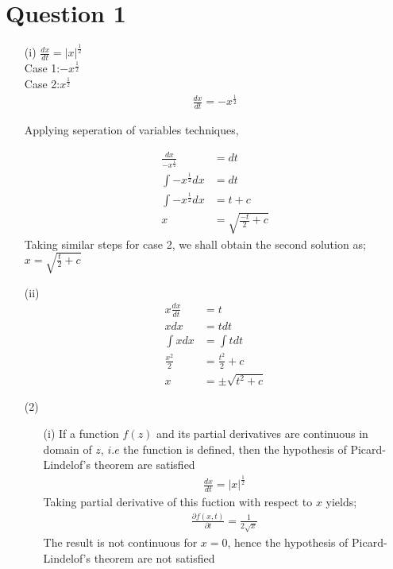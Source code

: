 \documentclass[12pt,a4paper]{article}
\begin{document}
\section*{Question 1}
\begin{itemize}
\item[(i)]
$\frac{dx}{dt}=|x|^{\frac{1}{2}}$\\
Case 1:$-x^{\frac{1}{2}}$\\
Case 2:$x^{\frac{1}{2}}$
\begin{align*}
\frac{dx}{dt}= -x^{\frac{1}{2}}
\end{align*}

Applying seperation of variables techniques,

\begin{align*}
\frac{dx}{-x^{\frac{1}{2}}}&=dt\\
\int -x^{\frac{1}{2}} dx&=dt\\
\int -x^{\frac{1}{2}}dx&=t+c\\
x&=\sqrt{\frac{-t}{2}+c}
\end{align*}
Taking similar steps for case 2, we shall obtain the second solution as;
$x=\sqrt{\frac{t}{2}+c}$

\item[(ii)]
\begin{align*}
x\frac{dx}{dt}&=t\\
xdx&=tdt\\
\int xdx&=\int tdt\\
\frac{{x^{2}}}{2}&=\frac{t^{2}}{2}+c\\
x&=\pm \sqrt{t^{2}+c}
\end{align*}

\item[(2)]
\begin{itemize}
\item[(i)] 
If a function $f(z)$ and its partial derivatives are continuous in domain of $z$, $i.e$ the function is defined, then the hypothesis of Picard-Lindelof's theorem are satisfied \\
\begin{align*}
\frac{dx}{dt}=|x|^{\frac{1}{2}}
\end{align*}
Taking partial derivative of this fuction with respect to $x$ yields;\\

\begin{align*}
\frac{\partial f(x,t)}{\partial t}=\frac{1}{2\sqrt{x}}
\end{align*}
The result is not continuous for $x=0$, hence the hypothesis of Picard-Lindelof's theorem are not satisfied


\end{itemize}
\end{itemize}
\end{document}
